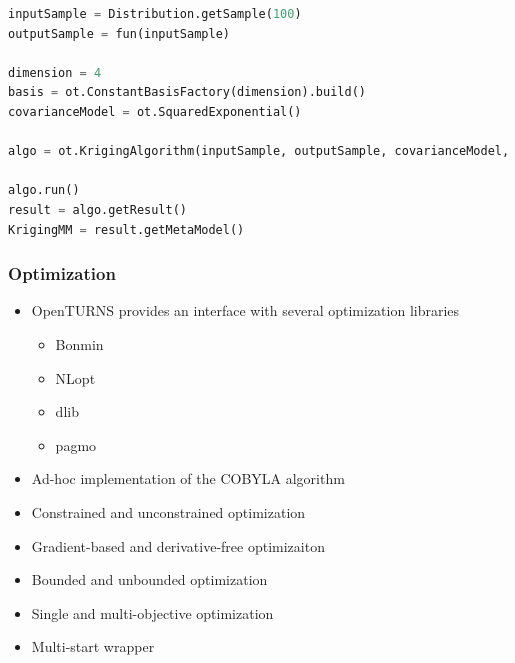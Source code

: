 \documentclass{beamer}
\begin{document}
\begin{frame}[containsverbatim]
\begin{minipage}[t]{0.5\textwidth}
\tiny
\begin{lstlisting}[language=Python, numbers = none]
inputSample = Distribution.getSample(100)
outputSample = fun(inputSample)

dimension = 4
basis = ot.ConstantBasisFactory(dimension).build()
covarianceModel = ot.SquaredExponential()

algo = ot.KrigingAlgorithm(inputSample, outputSample, covarianceModel, basis)
  
algo.run()
result = algo.getResult()
KrigingMM = result.getMetaModel()
\end{lstlisting}

\end{minipage}

\end{frame}




\begin{frame}[containsverbatim]
\frametitle{Optimization}


\begin{itemize}
\item OpenTURNS provides an interface with several optimization libraries
\begin{itemize}
\item Bonmin
\item NLopt
\item dlib
\item pagmo
\end{itemize}

\item Ad-hoc implementation of the COBYLA algorithm

\vspace{6pt}


\item Constrained and unconstrained optimization
\item Gradient-based and derivative-free optimizaiton
\item Bounded and unbounded optimization
\item Single and multi-objective optimization
\item Multi-start wrapper


\end{itemize}


\end{frame}



\end{document}
